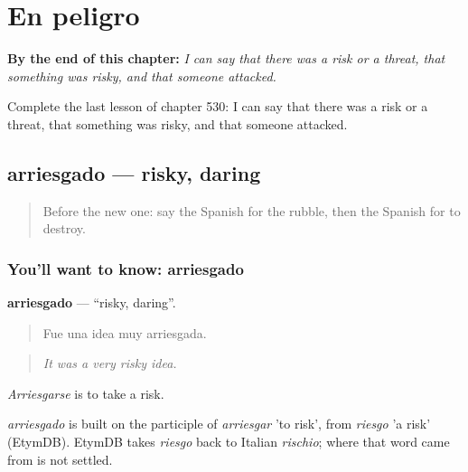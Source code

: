
\chapter{En peligro}
\label{ch:es-en-peligro}

\begin{chapteropening}
\textbf{By the end of this chapter:} \emph{I can say that there was a risk or a threat, that something was risky, and that someone attacked.}

Complete the last lesson of chapter 530: I can say that there was a risk or a threat, that something was risky, and that someone attacked.
\end{chapteropening}

\section[arriesgado]{arriesgado — risky, daring}

\label{lesson:ES-C530-arriesgado}



\begin{quote}
Before the new one: say the Spanish for the rubble, then the Spanish for to destroy.
\end{quote}

\subsection*{You'll want to know: arriesgado}
\textbf{arriesgado} — \textquotedblleft{}risky, daring\textquotedblright{}.

\begin{quote}
Fue una idea muy arriesgada.
\end{quote}

\begin{quote}
\emph{It was a very risky idea.}
\end{quote}

\emph{Arriesgarse} is to take a risk.

\begin{cousinweb}
\emph{arriesgado} is built on the participle of \emph{arriesgar} 'to risk', from \emph{riesgo} 'a risk' (EtymDB). EtymDB takes \emph{riesgo} back to Italian \emph{rischio}; where that word came from is not settled.
\end{cousinweb}

